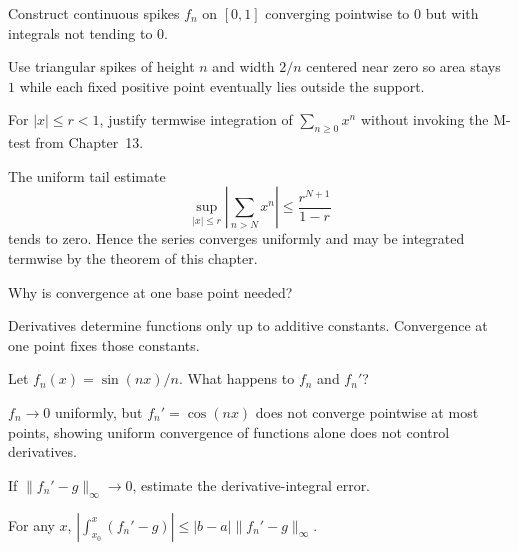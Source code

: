 \begin{problem}\label{prob:ii12-problem-02}
Construct continuous spikes $f_n$ on $[0,1]$ converging pointwise to $0$ but with integrals not tending to $0$.
\end{problem}
\begin{solution}
Use triangular spikes of height $n$ and width $2/n$ centered near zero so area stays $1$ while each fixed positive point eventually lies outside the support.
\end{solution}

\begin{problem}\label{prob:ii12-problem-03}
For $|x|\le r<1$, justify termwise integration of $\sum_{n\ge0}x^n$ without invoking the M-test from Chapter~13.
\end{problem}
\begin{solution}
The uniform tail estimate
\[
\sup_{|x|\le r}\left|\sum_{n>N}x^n\right|\le\frac{r^{N+1}}{1-r}
\]
tends to zero. Hence the series converges uniformly and may be integrated termwise by the theorem of this chapter.
\end{solution}

\begin{problem}\label{prob:ii12-problem-04}
Why is convergence at one base point needed?
\end{problem}
\begin{solution}
Derivatives determine functions only up to additive constants. Convergence at one point fixes those constants.
\end{solution}

\begin{problem}\label{prob:ii12-problem-05}
Let $f_n(x)=\sin(nx)/n$. What happens to $f_n$ and $f_n'$?
\end{problem}
\begin{solution}
$f_n\to0$ uniformly, but $f_n'=\cos(nx)$ does not converge pointwise at most points, showing uniform convergence of functions alone does not control derivatives.
\end{solution}

\begin{problem}\label{prob:ii12-problem-06}
If $\|f_n'-g\|_\infty\to0$, estimate the derivative-integral error.
\end{problem}
\begin{solution}
For any $x$, $|\int_{x_0}^x(f_n'-g)|\le |b-a|\|f_n'-g\|_\infty$.
\end{solution}

